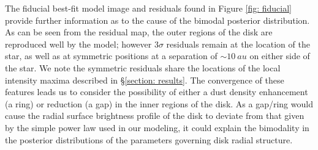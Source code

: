 \documentclass[modern]{aastex62}
\begin{document}
The fiducial best-fit model image and residuals found in Figure \ref{fig: fiducial} provide further information as to the cause of the bimodal posterior distribution.
As can be seen from the residual map, the outer regions of the disk are reproduced well by the model; however $3\sigma$ residuals remain at the location of the star, as well as at symmetric positions at a separation of $\sim \SI{10}{au}$ on either side of the star. 
We note the symmetric residuals share the locations of the local intensity maxima described in \S \ref{section: results}. 
The convergence of these features leads us to consider the possibility of either a dust density enhancement (a ring) or reduction (a gap) in the inner regions of the disk. 
As a gap/ring would cause the radial surface brightness profile of the disk to deviate from that given by the simple power law used in our modeling, it could explain the bimodality in the posterior distributions of the parameters governing disk radial structure.
\end{document}
